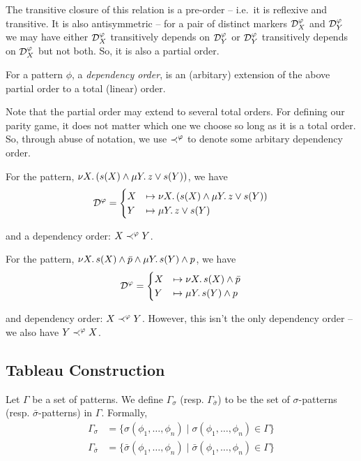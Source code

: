The transitive closure of this relation is a pre-order -- i.e.~it is reflexive and transitive.
It is also antisymmetric -- for a pair of distinct markers \(\mathcal D^\varphi_X\) and \(\mathcal D^\varphi_Y\)
we may have either \(\mathcal D^\varphi_X\) transitively depends on \(\mathcal D^\varphi_Y\)
or \(\mathcal D^\varphi_Y\) transitively depends on \(\mathcal D^\varphi_X\) but not both.
So, it is also a partial order.

\begin{definition}For a pattern \(\phi\), a \emph{dependency order},
is an (arbitary) extension of the above partial order to a total (linear) order.\end{definition}

Note that the partial order may extend to several total orders.
For defining our parity game, it does not matter which one we choose so long as it is a total order.
So, through abuse of notation, we use \(\prec^\varphi\) to denote some arbitary dependency order.

\begin{example}For the pattern, \(\nu X \ldotp (s(X) \land \mu Y \ldotp z \lor s(Y))\),
we have \[\mathcal D^\varphi = 
\begin{cases}
X &\mapsto \nu X \ldotp (s(X) \land \mu Y \ldotp z \lor s(Y)) \\
Y &\mapsto \mu Y \ldotp z \lor s(Y)
\end{cases}\]

and a dependency order: \(X \prec^\varphi Y\).\end{example}

\begin{example}For the pattern, \(\nu X \ldotp s(X) \land \bar p \land \mu Y \ldotp s(Y) \land p\),
we have \[\mathcal D^\varphi = 
\begin{cases}
X &\mapsto \nu X \ldotp s(X) \land \bar p \\
Y &\mapsto \mu Y \ldotp s(Y) \land p
\end{cases}\]

and dependency order: \(X \prec^\varphi Y\).
However, this isn't the only dependency order -- we also have \(Y \prec^\varphi X\).\end{example}

\hypertarget{tableau-construction}{%
\subsection{Tableau Construction}\label{tableau-construction}}

\begin{definition}
Let $\Gamma$ be a set of patterns.
We define $\Gamma_\sigma$ (resp. $\Gamma_{\bar\sigma}$) to be the set of 
$\sigma$-patterns 
(resp. $\bar\sigma$-patterns) in $\Gamma$.
Formally,
\begin{align*}
\Gamma_\sigma &= \{ 
\sigma(\phi_1,\dots,\phi_n) \mid \sigma(\phi_1,\dots,\phi_n) \in 
\Gamma \} \\
\Gamma_{\bar\sigma} &= \{ 
\bar\sigma(\phi_1,\dots,\phi_n) \mid \bar\sigma(\phi_1,\dots,\phi_n) \in 
\Gamma \}
\end{align*}
\end{definition}

